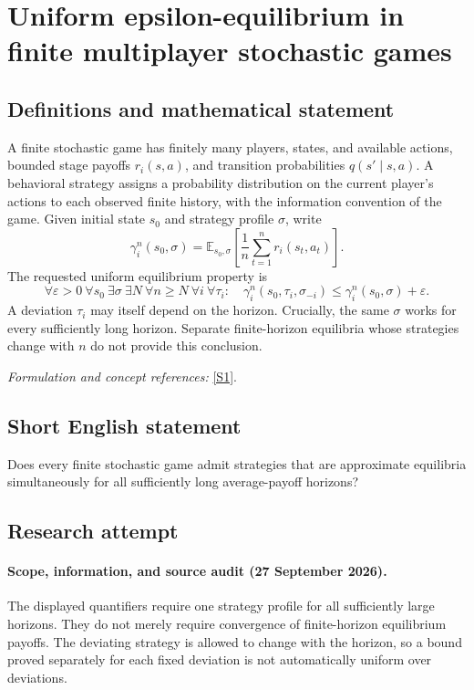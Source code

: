 \documentclass[11pt]{article}
\begin{document}
\section*{\texorpdfstring{Uniform epsilon-equilibrium in finite multiplayer stochastic games}{Uniform epsilon-equilibrium in finite multiplayer stochastic games}}\label{451}
\subsection{Definitions and mathematical statement}
A finite stochastic game has finitely many players, states, and available actions, bounded stage payoffs $r_i(s,a)$, and transition probabilities $q(s'\mid s,a)$. A behavioral strategy assigns a probability distribution on the current player's actions to each observed finite history, with the information convention of the game. Given initial state $s_0$ and strategy profile $\sigma$, write
\[
 \gamma_i^n(s_0,\sigma)={\mathbb{E}}_{s_0,\sigma}
 \left[\frac1n\sum_{t=1}^n r_i(s_t,a_t)\right].
\]
The requested uniform equilibrium property is
\[
 \forall{\varepsilon}>0\ \forall s_0\ \exists\sigma\ \exists N\
 \forall n\ge N\ \forall i\ \forall\tau_i:\quad
 \gamma_i^n(s_0,\tau_i,\sigma_{-i})
 \le\gamma_i^n(s_0,\sigma)+{\varepsilon}.
\]
A deviation $\tau_i$ may itself depend on the horizon. Crucially, the same $\sigma$ works for every sufficiently long horizon. Separate finite-horizon equilibria whose strategies change with $n$ do not provide this conclusion.
\par\smallskip\textit{Formulation and concept references:} \href{https://mathconjectures.com/conjectures/GAME-001}{[S1]}.

\subsection{Short English statement}
Does every finite stochastic game admit strategies that are approximate equilibria simultaneously for all sufficiently long average-payoff horizons?
\subsection{Research attempt}
\paragraph{Scope, information, and source audit (27 September 2026).}
The displayed quantifiers require one strategy profile for all sufficiently
large horizons. They do not merely require convergence of finite-horizon
equilibrium payoffs. The deviating strategy is allowed to change with the
horizon, so a bound proved separately for each fixed deviation is not
automatically uniform over deviations.
\end{document}
